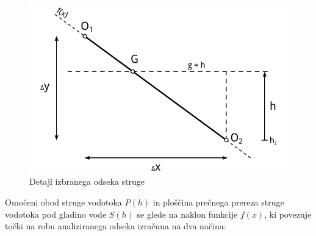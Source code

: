 \begin{figure}[H]
	\begin{centering}
		\includegraphics{slike/customChannel/odsek_detajl.pdf}\caption{Detajl izbranega odseka struge}\label{fig:custom_odsekDetajl}
	\end{centering}
\end{figure}



Omočeni obod struge vodotoka $P(h)$ in ploščina prečnega prereza struge vodotoka pod gladino vode $S(h)$ se glede na naklon funkcije $f(x)$, ki povezuje točki na robu analiziranega odseka izračuna na dva načina:

